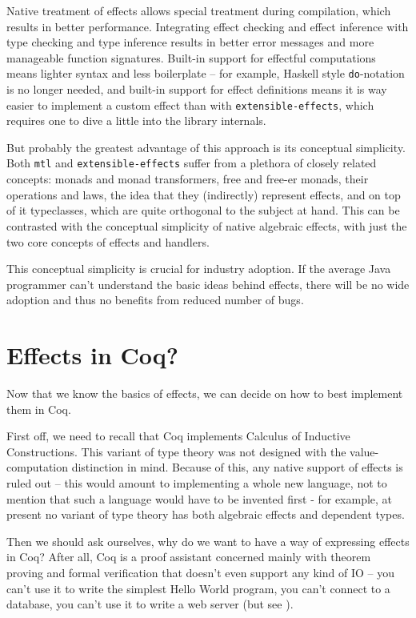 \documentclass[declaration,inz,english,shortabstract]{iithesis}
\newcommand{\m}[1]{\texttt{#1}}
\begin{document}
Native treatment of effects allows special treatment during compilation, which results in better performance. Integrating effect checking and effect inference with type checking and type inference results in better error messages and more manageable function signatures. Built-in support for effectful computations means lighter syntax and less boilerplate -- for example, Haskell style \m{do}-notation is no longer needed, and built-in support for effect definitions means it is way easier to implement a custom effect than with \m{extensible-effects}, which requires one to dive a little into the library internals.

But probably the greatest advantage of this approach is its conceptual simplicity. Both \m{mtl} and \m{extensible-effects} suffer from a plethora of closely related concepts: monads and monad transformers, free and free-er monads, their operations and laws, the idea that they (indirectly) represent effects, and on top of it typeclasses, which are quite orthogonal to the subject at hand. This can be contrasted with the conceptual simplicity of native algebraic effects, with just the two core concepts of effects and handlers.

This conceptual simplicity is crucial for industry adoption. If the average Java programmer can't understand the basic ideas behind effects, there will be no wide adoption and thus no benefits from reduced number of bugs.

\section{Effects in Coq?}

Now that we know the basics of effects, we can decide on how to best implement them in Coq.

First off, we need to recall that Coq implements Calculus of Inductive Constructions. This variant of type theory was not designed with the value-computation distinction in mind. Because of this, any native support of effects is ruled out -- this would amount to implementing a whole new language, not to mention that such a language would have to be invented first - for example, at present no variant of type theory has both algebraic effects and dependent types.

Then we should ask ourselves, why do we want to have a way of expressing effects in Coq? After all, Coq is a proof assistant concerned mainly with theorem proving and formal verification that doesn't even support any kind of IO -- you can't use it to write the simplest Hello World program, you can't connect to a database, you can't use it to write a web server (but see \cite{CoqIO}).
\end{document}
